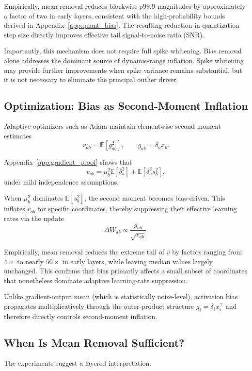 Empirically, mean removal reduces blockwise $p99.9$ magnitudes by
approximately a factor of two in early layers, consistent with the
high-probability bounds derived in Appendix~\ref{app:quant_bias}.
The resulting reduction in quantization step size directly improves effective
tail signal-to-noise ratio (SNR).

Importantly, this mechanism does not require full spike whitening.
Bias removal alone addresses the dominant source of dynamic-range inflation.
Spike whitening may provide further improvements when spike variance remains
substantial, but it is not necessary to eliminate the principal outlier driver.

\subsection{Optimization: Bias as Second-Moment Inflation}

Adaptive optimizers such as Adam maintain elementwise second-moment estimates
\[
v_{ab} = \mathbb{E}[g_{ab}^2],
\qquad
g_{ab} = \delta_a x_b.
\]

Appendix~\ref{app:gradient_proof} shows that
\[
v_{ab}
=
\mu_b^2 \mathbb{E}[\delta_a^2]
+
\mathbb{E}[\delta_a^2 s_b^2],
\]
under mild independence assumptions.

When $\mu_b^2$ dominates $\mathbb{E}[s_b^2]$, the second moment becomes
bias-driven. This inflates $v_{ab}$ for specific coordinates, thereby
suppressing their effective learning rates via the update
\[
\Delta W_{ab} \propto \frac{g_{ab}}{\sqrt{v_{ab}}}.
\]

Empirically, mean removal reduces the extreme tail of $v$ by factors ranging
from $4\times$ to nearly $50\times$ in early layers, while leaving median
values largely unchanged. This confirms that bias primarily affects a small
subset of coordinates that nonetheless dominate adaptive learning-rate
suppression.

Unlike gradient-output mean (which is statistically noise-level), activation
bias propagates multiplicatively through the outer-product structure
$g_i = \delta_i x_i^\top$ and therefore directly controls second-moment
inflation.

\subsection{When Is Mean Removal Sufficient?}

The experiments suggest a layered interpretation:

